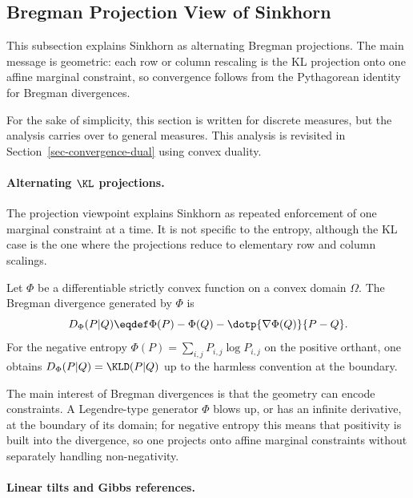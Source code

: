 \subsection{Bregman Projection View of Sinkhorn}
\label{sec-convergence-init}

This subsection explains Sinkhorn as alternating Bregman projections. The main message is geometric: each row or column rescaling is the KL projection onto one affine marginal constraint, so convergence follows from the Pythagorean identity for Bregman divergences.

For the sake of simplicity, this section is written for discrete measures, but the analysis carries over to general measures. This analysis is revisited in Section~\ref{sec-convergence-dual} using convex duality.

\paragraph{Alternating $\KL$ projections.}

The projection viewpoint explains Sinkhorn as repeated enforcement of one marginal constraint at a time. It is not specific to the entropy, although the KL case is the one where the projections reduce to elementary row and column scalings.

\begin{defn}\label{def-bregman-divergence}
	Let $\Phi$ be a differentiable strictly convex function on a convex domain $\Omega$. The Bregman divergence generated by $\Phi$ is
	\[
		D_\Phi(P|Q)\eqdef \Phi(P)-\Phi(Q)-\dotp{\nabla\Phi(Q)}{P-Q}.
	\]
	For the negative entropy $\Phi(P)=\sum_{i,j}P_{i,j}\log P_{i,j}$ on the positive orthant, one obtains $D_\Phi(P|Q)=\KLD(P|Q)$ up to the harmless convention at the boundary.
\end{defn}

The main interest of Bregman divergences is that the geometry can encode constraints. A Legendre-type generator $\Phi$ blows up, or has an infinite derivative, at the boundary of its domain; for negative entropy this means that positivity is built into the divergence, so one projects onto affine marginal constraints without separately handling non-negativity.

\paragraph{Linear tilts and Gibbs references.}

